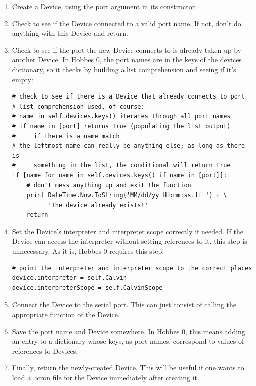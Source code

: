\documentclass[12pt,letterpaper]{article}
\begin{document}
\begin{enumerate}

\item Create a Device, using the port argument in \hyperref[4.3.1.2.0]{its constructor}

\item Check to see if the Device connected to a valid port name. If not, don't do anything with this Device and return.

\item Check to see if the port the new Device connects to is already taken up by another Device. In Hobbes 0, the port names are in the keys of the devices dictionary, so it checks by building a list comprehension and seeing if it's empty:

\selectfont

\begin{lstlisting}
# check to see if there is a Device that already connects to port
# list comprehension used, of course:
# name in self.devices.keys() iterates through all port names
# if name in [port] returns True (populating the list output)
#     if there is a name match
# the leftmost name can really be anything else; as long as there is
#     something in the list, the conditional will return True
if [name for name in self.devices.keys() if name in [port]]:
    # don't mess anything up and exit the function
    print DateTime.Now.ToString('MM/dd/yy HH:mm:ss.ff ') + \
          'The device already exists!'
    return
\end{lstlisting}

\selectfont

\item Set the Device's interpreter and interpreter scope correctly if needed. If the Device can access the interpreter without setting references to it, this step is unnecessary. As it is, Hobbes 0 requires this step:

\selectfont

\begin{lstlisting}
# point the interpreter and interpreter scope to the correct places
device.interpreter = self.Calvin
device.interpreterScope = self.CalvinScope
\end{lstlisting}

\selectfont

\item Connect the Device to the serial port. This can just consist of calling the \hyperref[4.3.1.2.1]{appropriate function} of the Device.

\item Save the port name and Device somewhere. In Hobbes 0, this means adding an entry to a dictionary whose keys, as port names, correspond to values of references to Devices.

\item Finally, return the newly-created Device. This will be useful if one wants to load a .icron file for the Device immediately after creating it.

\end{enumerate}
\end{document}
